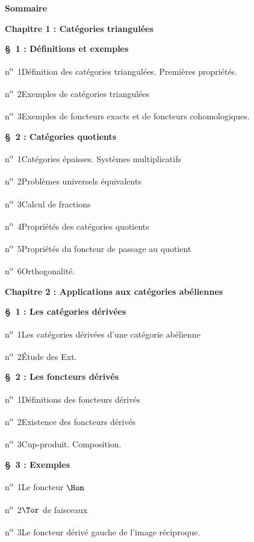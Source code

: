 \begin{center}\textbf{Sommaire}\end{center}
\begin{center}\textbf{Chapitre 1 : Catégories triangulées}\end{center}
\noindent\textbf{\S~1 : Définitions et exemples}\par
\noindent n\textsuperscript{o}~1\quad Définition des catégories triangulées. Premières propriétés.\par
\noindent n\textsuperscript{o}~2\quad Exemples de catégories triangulées\par
\noindent n\textsuperscript{o}~3\quad Exemples de foncteurs exacts et de foncteurs cohomologiques.\par
\medskip\noindent\textbf{\S~2 : Catégories quotients}\par
\noindent n\textsuperscript{o}~1\quad Catégories épaisses. Systèmes multiplicatifs\par
\noindent n\textsuperscript{o}~2\quad Problèmes universels équivalents\par
\noindent n\textsuperscript{o}~3\quad Calcul de fractions\par
\noindent n\textsuperscript{o}~4\quad Propriétés des catégories quotients\par
\noindent n\textsuperscript{o}~5\quad Propriétés du foncteur de passage au quotient\par
\noindent n\textsuperscript{o}~6\quad Orthogonalité.\par
\begin{center}\textbf{Chapitre 2 : Applications aux catégories abéliennes}\end{center}
\noindent\textbf{\S~1 : Les catégories dérivées}\par
\noindent n\textsuperscript{o}~1\quad Les catégories dérivées d'une catégorie abélienne\par
\noindent n\textsuperscript{o}~2\quad Étude des Ext.\par
\medskip\noindent\textbf{\S~2 : Les foncteurs dérivés}\par
\noindent n\textsuperscript{o}~1\quad Définitions des foncteurs dérivés\par
\noindent n\textsuperscript{o}~2\quad Existence des foncteurs dérivés\par
\noindent n\textsuperscript{o}~3\quad Cup-produit. Composition.\par
\medskip\noindent\textbf{\S~3 : Exemples}\par
\noindent n\textsuperscript{o}~1\quad Le foncteur $\Hom$\par
\noindent n\textsuperscript{o}~2\quad $\Tor$ de faisceaux\par
\noindent n\textsuperscript{o}~3\quad Le foncteur dérivé gauche de l'image réciproque.\par

